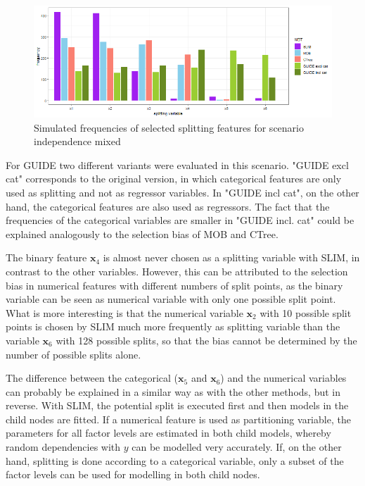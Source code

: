 \begin{figure}[!htb]
    \centering
    \includegraphics[width=14cm]{Figures/simulations/batchtools/selection_bias_general/independence_mixed.png}
    \caption{Simulated frequencies of selected splitting features for scenario independence mixed}
    \label{fig:selection_bias_independence_mixed}
\end{figure}

For GUIDE two different variants were evaluated in this scenario. "GUIDE excl cat" corresponds to the original version, in which categorical features are only used as splitting and not as regressor variables. In "GUIDE incl cat", on the other hand, the categorical features are also used as regressors. The fact that the frequencies of the categorical variables are smaller in "GUIDE incl. cat" could be explained analogously to the selection bias of MOB and CTree.

The binary feature $\textbf{x}_4$ is almost never chosen as a splitting variable with SLIM, in contrast to the other variables. However, this can be attributed to the selection bias in numerical features with different numbers of split points, as the binary variable can be seen as numerical variable with only one possible split point. What is more interesting is that the numerical variable $\textbf{x}_2$ with 10 possible split points is chosen by SLIM much more frequently as splitting variable than the variable $\textbf{x}_6$ with 128 possible splits, so that the bias cannot be determined by the number of possible splits alone.

The difference between the categorical ($\textbf{x}_5$ and $\textbf{x}_6$) and the numerical variables can probably be explained in a similar way as with the other methods, but in reverse. With SLIM, the potential split is executed first and then models in the child nodes are fitted.  If a numerical feature is used as partitioning variable, the parameters for all factor levels are estimated in both child models, whereby random dependencies with $y$ can be modelled very accurately. If, on the other hand, splitting is done according to a categorical variable, only a subset of the factor levels can be used for modelling in both child nodes.






